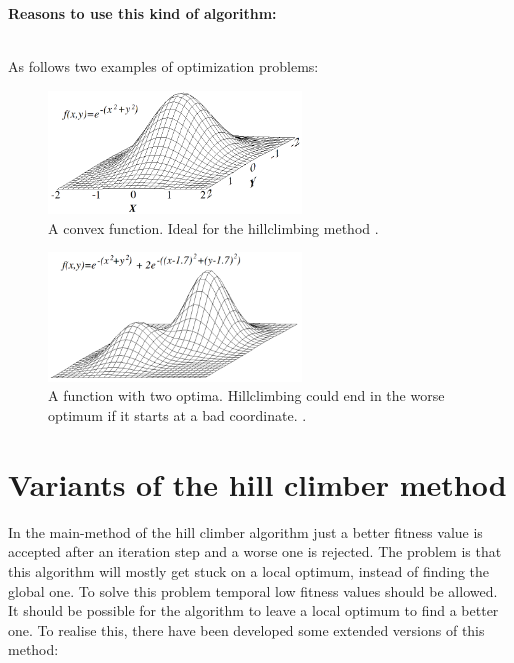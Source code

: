 \documentclass[10pt,a4paper,DIV=11]{scrreprt}
\begin{document}
\textbf{Reasons to use this kind of algorithm:}

   \\

As follows two examples of optimization problems:


\begin{center}
	\begin{figure}[H]
		\centering
		\includegraphics[width=0.6\textwidth,scale=1]{files/Hill_climb.png}  
		\caption{A convex function. Ideal for the hillclimbing method \cite{wiki-hill}.}
		\label{fig:hill}
	\end{figure}
\end{center}

\begin{center}
	\begin{figure}[H]
		\centering
		\includegraphics[width=0.6\textwidth,scale=1]{files/Local_maximum.png}  
		\caption{A function with two optima. Hillclimbing could end in the worse optimum if it starts at a bad coordinate. \cite{wiki-hill}.}
		\label{fig:hill2}
	\end{figure}
\end{center}


\section{Variants of the hill climber method}
In the main-method of the hill climber algorithm just a better fitness value is accepted after an iteration step and a worse one is rejected.
The problem is that this algorithm will mostly get stuck on a local optimum, instead of finding the global one.
To solve this problem temporal low fitness values should be allowed. It should be possible for the algorithm to leave a local optimum to find a better one.
To realise this, there have been developed some extended versions of this method: \\
\end{document}
